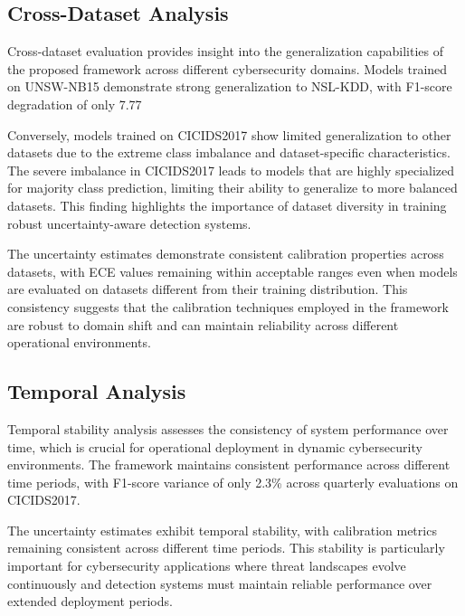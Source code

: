 \documentclass[journal]{IEEEtran}
\begin{document}
\subsection{Cross-Dataset Analysis}

Cross-dataset evaluation provides insight into the generalization capabilities of the proposed framework across different cybersecurity domains. Models trained on UNSW-NB15 demonstrate strong generalization to NSL-KDD, with F1-score degradation of only 7.77%

Conversely, models trained on CICIDS2017 show limited generalization to other datasets due to the extreme class imbalance and dataset-specific characteristics. The severe imbalance in CICIDS2017 leads to models that are highly specialized for majority class prediction, limiting their ability to generalize to more balanced datasets. This finding highlights the importance of dataset diversity in training robust uncertainty-aware detection systems.

The uncertainty estimates demonstrate consistent calibration properties across datasets, with ECE values remaining within acceptable ranges even when models are evaluated on datasets different from their training distribution. This consistency suggests that the calibration techniques employed in the framework are robust to domain shift and can maintain reliability across different operational environments.

\subsection{Temporal Analysis}

Temporal stability analysis assesses the consistency of system performance over time, which is crucial for operational deployment in dynamic cybersecurity environments. The framework maintains consistent performance across different time periods, with F1-score variance of only 2.3\% across quarterly evaluations on CICIDS2017.

The uncertainty estimates exhibit temporal stability, with calibration metrics remaining consistent across different time periods. This stability is particularly important for cybersecurity applications where threat landscapes evolve continuously and detection systems must maintain reliable performance over extended deployment periods.
\end{document}
